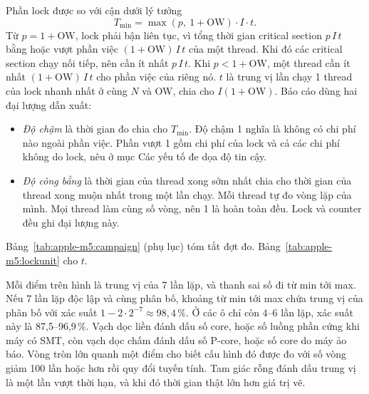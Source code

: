 Phần lock được so với cận dưới lý tưởng
\[ T_{\min} = \max(p,\ 1+\mathrm{OW})\cdot I\cdot t. \]
Từ $p = 1+\mathrm{OW}$, lock phải bận liên tục, vì tổng thời gian critical section $p\,I\,t$ bằng
hoặc vượt phần việc $(1+\mathrm{OW})\,I\,t$ của một thread. Khi đó các critical section chạy nối tiếp,
nên cần ít nhất $p\,I\,t$. Khi $p < 1+\mathrm{OW}$, một thread cần ít nhất $(1+\mathrm{OW})\,I\,t$
cho phần việc của riêng nó. $t$ là trung vị lần chạy 1
thread của lock nhanh nhất ở cùng $N$ và OW, chia cho $I(1+\mathrm{OW})$. Báo cáo dùng hai đại lượng
dẫn xuất:
\begin{itemize}[nosep]
  \item \emph{Độ chậm} là thời gian đo chia cho $T_{\min}$. Độ chậm 1 nghĩa là không có chi phí nào
    ngoài phần việc. Phần vượt 1 gồm chi phí của lock và cả các chi phí không do lock, nêu ở mục Các
    yếu tố đe dọa độ tin cậy.
  \item \emph{Độ công bằng} là thời gian của thread xong sớm nhất chia cho thời gian của thread xong
    muộn nhất trong một lần chạy. Mỗi thread tự đo vòng lặp của mình. Mọi thread làm cùng số vòng,
    nên 1 là hoàn toàn đều. Lock và counter đều ghi đại lượng này.
\end{itemize}
Bảng~\ref{tab:apple-m5:campaign} (phụ lục) tóm tắt đợt đo. Bảng~\ref{tab:apple-m5:lockunit} cho $t$.

Mỗi điểm trên hình là trung vị của 7 lần lặp, và thanh sai số đi từ min tới max. Nếu 7 lần lặp độc
lập và cùng phân bố, khoảng từ min tới max chứa trung vị của phân bố với xác suất $1 - 2 \cdot 2^{-7}
\approx 98{,}4\,\%$. Ở các ô chỉ còn 4--6 lần lặp, xác suất này là 87,5--96,9\,\%. Vạch dọc liền đánh
dấu số core, hoặc số luồng phần cứng khi máy có SMT, còn vạch dọc chấm đánh dấu số P-core, hoặc số core
do máy ảo báo. Vòng tròn lớn quanh một điểm cho biết cấu hình đó được đo với số vòng giảm 100 lần hoặc
hơn rồi quy đổi tuyến tính. Tam giác rỗng đánh dấu trung vị là một lần vượt thời hạn, và khi đó thời gian thật
lớn hơn giá trị vẽ.

